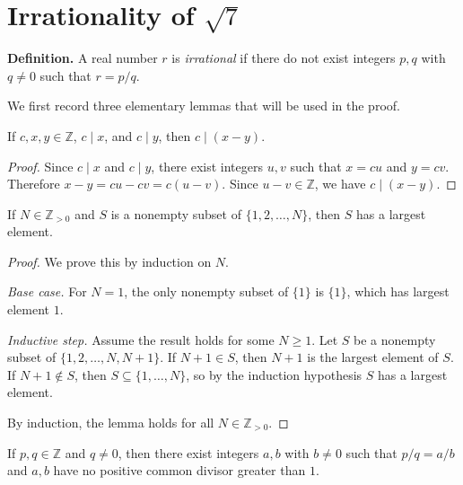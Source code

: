 \section*{Irrationality of $\sqrt{7}$}

\noindent\textbf{Definition.}
A real number $r$ is \emph{irrational} if there do not exist integers $p, q$ with $q \neq 0$ such that $r = p/q$.

\bigskip

We first record three elementary lemmas that will be used in the proof.

\begin{lemma}\label{lem:div-sub}
If $c, x, y \in \mathbb{Z}$, $c \mid x$, and $c \mid y$, then $c \mid (x - y)$.
\end{lemma}

\begin{proof}
Since $c \mid x$ and $c \mid y$, there exist integers $u, v$ such that $x = cu$ and $y = cv$.
Therefore $x - y = cu - cv = c(u - v)$. Since $u - v \in \mathbb{Z}$, we have $c \mid (x - y)$.
\end{proof}

\begin{lemma}\label{lem:fin-max}
If $N \in \mathbb{Z}_{>0}$ and $S$ is a nonempty subset of $\{1, 2, \ldots, N\}$, then $S$ has a largest element.
\end{lemma}

\begin{proof}
We prove this by induction on $N$.

\textit{Base case.} For $N = 1$, the only nonempty subset of $\{1\}$ is $\{1\}$, which has largest element $1$.

\textit{Inductive step.} Assume the result holds for some $N \geq 1$. Let $S$ be a nonempty subset of $\{1, 2, \ldots, N, N+1\}$. If $N+1 \in S$, then $N+1$ is the largest element of $S$. If $N+1 \notin S$, then $S \subseteq \{1, \ldots, N\}$, so by the induction hypothesis $S$ has a largest element.

By induction, the lemma holds for all $N \in \mathbb{Z}_{>0}$.
\end{proof}

\begin{lemma}\label{lem:low-terms}
If $p, q \in \mathbb{Z}$ and $q \neq 0$, then there exist integers $a, b$ with $b \neq 0$ such that $p/q = a/b$ and $a, b$ have no positive common divisor greater than $1$.
\end{lemma}

